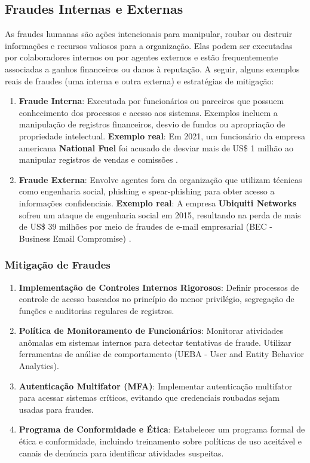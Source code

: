 \documentclass[12pt,oneside,a4paper,article]{abntex2}
\begin{document}
\subsection{Fraudes Internas e Externas}

As fraudes humanas são ações intencionais para manipular, roubar ou destruir informações e recursos valiosos para a organização. Elas podem ser executadas por colaboradores internos ou por agentes externos e estão frequentemente associadas a ganhos financeiros ou danos à reputação. A seguir, alguns exemplos reais de fraudes (uma interna e outra externa) e estratégias de mitigação:

\begin{enumerate}
    \item \textbf{Fraude Interna}: Executada por funcionários ou parceiros que possuem conhecimento dos processos e acesso aos sistemas. Exemplos incluem a manipulação de registros financeiros, desvio de fundos ou apropriação de propriedade intelectual. \textbf{Exemplo real}: Em 2021, um funcionário da empresa americana \textbf{National Fuel} foi acusado de desviar mais de US\$ 1 milhão ao manipular registros de vendas e comissões \cite{nationalfuel}.
    
    \item \textbf{Fraude Externa}: Envolve agentes fora da organização que utilizam técnicas como engenharia social, phishing e spear-phishing para obter acesso a informações confidenciais. \textbf{Exemplo real}: A empresa \textbf{Ubiquiti Networks} sofreu um ataque de engenharia social em 2015, resultando na perda de mais de US\$ 39 milhões por meio de fraudes de e-mail empresarial (BEC - Business Email Compromise) \cite{ubiquiti}.
\end{enumerate}

\subsubsection{Mitigação de Fraudes}

\begin{enumerate}
    \item \textbf{Implementação de Controles Internos Rigorosos}: Definir processos de controle de acesso baseados no princípio do menor privilégio, segregação de funções e auditorias regulares de registros.
    
    \item \textbf{Política de Monitoramento de Funcionários}: Monitorar atividades anômalas em sistemas internos para detectar tentativas de fraude. Utilizar ferramentas de análise de comportamento (UEBA - User and Entity Behavior Analytics).
    
    \item \textbf{Autenticação Multifator (MFA)}: Implementar autenticação multifator para acessar sistemas críticos, evitando que credenciais roubadas sejam usadas para fraudes.
    
    \item \textbf{Programa de Conformidade e Ética}: Estabelecer um programa formal de ética e conformidade, incluindo treinamento sobre políticas de uso aceitável e canais de denúncia para identificar atividades suspeitas.
\end{enumerate}
\end{document}
